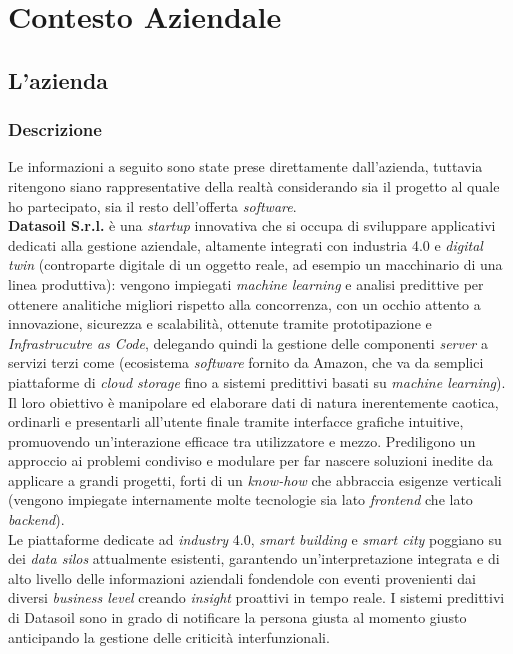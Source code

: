 
\chapter{Contesto Aziendale}
\label{cap:contesto-aziendale}

\section{L'azienda}
\subsection{Descrizione}
Le informazioni a seguito sono state prese direttamente dall'azienda, tuttavia ritengono siano rappresentative della realtà considerando sia il progetto al quale ho partecipato, sia il resto dell'offerta \textit{software}.\\
\textbf{Datasoil S.r.l.} è una \textit{startup} innovativa che si occupa di sviluppare applicativi dedicati alla gestione aziendale, altamente integrati con industria 4.0 e \textit{digital twin} (controparte digitale di un oggetto reale, ad esempio un macchinario di una linea produttiva): vengono impiegati \textit{machine learning} e analisi predittive per ottenere analitiche migliori rispetto alla concorrenza, con un occhio attento a innovazione, sicurezza e scalabilità, ottenute tramite prototipazione e \textit{Infrastrucutre as Code}, delegando quindi la gestione delle componenti \textit{server} a servizi terzi come \aws{} (ecosistema \textit{software} fornito da Amazon, che va da semplici piattaforme di \textit{cloud storage} fino a sistemi predittivi basati su \textit{machine learning}).\\
Il loro obiettivo è manipolare ed elaborare dati di natura inerentemente caotica, ordinarli e presentarli all'utente finale tramite interfacce grafiche intuitive, promuovendo un'interazione efficace tra utilizzatore e mezzo. Prediligono un approccio ai problemi condiviso e modulare per far nascere soluzioni inedite da applicare a grandi progetti, forti di un \textit{know-how} che abbraccia esigenze verticali (vengono impiegate internamente molte tecnologie sia lato \textit{frontend} che lato \textit{backend}).\\
Le piattaforme dedicate ad \textit{industry} 4.0, \textit{smart building} e \textit{smart city} poggiano su dei \textit{data silos} attualmente esistenti, garantendo un'interpretazione integrata e di alto livello delle informazioni aziendali fondendole con eventi provenienti dai diversi \textit{business level} creando \textit{insight} proattivi in tempo reale. I sistemi predittivi di Datasoil sono in grado di notificare la persona giusta al momento giusto anticipando la gestione delle criticità interfunzionali.\\

